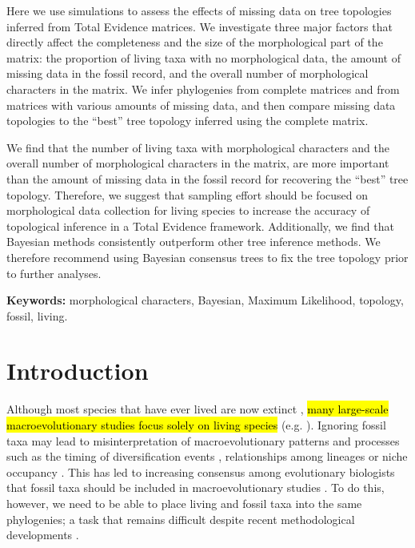 \documentclass[12pt,letterpaper]{article}
\begin{document}
Here we use simulations to assess the effects of missing data on tree topologies inferred from Total Evidence matrices.
We investigate three major factors that directly affect the completeness and the size of the morphological part of the matrix: the proportion of living taxa with no morphological data, the amount of missing data in the fossil record, and the overall number of morphological characters in the matrix.
We infer phylogenies from complete matrices and from matrices with various amounts of missing data, and then compare missing data topologies to the ``best'' tree topology inferred using the complete matrix.

We find that the number of living taxa with morphological characters and the overall number of morphological characters in the matrix, are more important than the amount of missing data in the fossil record for recovering the ``best'' tree topology.
Therefore, we suggest that sampling effort should be focused on morphological data collection for living species to increase the accuracy of topological inference in a Total Evidence framework.
Additionally, we find that Bayesian methods consistently outperform other tree inference methods.
We therefore recommend using Bayesian consensus trees to fix the tree topology prior to further analyses.

\bigskip
\noindent
\textbf{Keywords:} morphological characters, Bayesian, Maximum Likelihood, topology, fossil, living.

%
%

\newpage
\section{Introduction}
Although most species that have ever lived are now extinct \citep{novacek1992ext,raup1993extinction}, \hl{many large-scale macroevolutionary studies focus solely on living species} (e.g. \citealp{meredithimpacts2011,jetzthe2012}).
Ignoring fossil taxa may lead to misinterpretation of macroevolutionary patterns and processes such as the timing of diversification events \citep[e.g.][]{pyrondivergence2011}, relationships among lineages \citep[e.g.][]{manosphylogeny2007} or niche occupancy \citep[e.g.][]{pearmanniche2008}.
This has led to increasing consensus among evolutionary biologists that fossil taxa should be included in macroevolutionary studies \citep{jacksonwhat2006,quentaldiversity2010,dietlconservation2011,slaterunifying2013,fritzdiversity2013}.
To do this, however, we need to be able to place living and fossil taxa into the same phylogenies; a task that remains difficult despite recent methodological developments \citep[e.g.][]{pyrondivergence2011,ronquista2012,BEASTmaster}.
\end{document}
